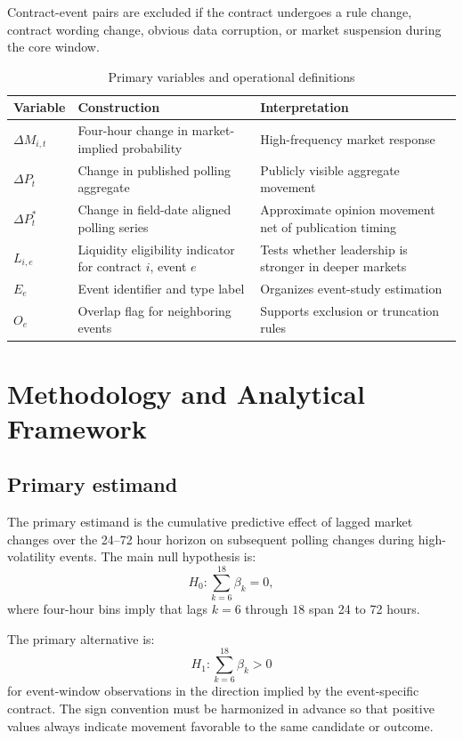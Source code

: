 \documentclass[11pt]{article}
\begin{document}
Contract-event pairs are excluded if the contract undergoes a rule change, contract wording change, obvious data corruption, or market suspension during the core window.

\begin{table}[t]
\centering
\caption{Primary variables and operational definitions}
\begin{tabular}{p{3.1cm}p{4.2cm}p{5.3cm}}
\toprule
Variable & Construction & Interpretation \\
\midrule
$\Delta M_{i,t}$ & Four-hour change in market-implied probability & High-frequency market response \\
$\Delta P_t$ & Change in published polling aggregate & Publicly visible aggregate movement \\
$\Delta P_t^{\ast}$ & Change in field-date aligned polling series & Approximate opinion movement net of publication timing \\
$L_{i,e}$ & Liquidity eligibility indicator for contract $i$, event $e$ & Tests whether leadership is stronger in deeper markets \\
$E_e$ & Event identifier and type label & Organizes event-study estimation \\
$O_e$ & Overlap flag for neighboring events & Supports exclusion or truncation rules \\
\bottomrule
\end{tabular}
\end{table}

\section{Methodology and Analytical Framework}

\subsection{Primary estimand}
The primary estimand is the cumulative predictive effect of lagged market changes over the 24--72 hour horizon on subsequent polling changes during high-volatility events. The main null hypothesis is:
\[
H_0: \sum_{k=6}^{18} \beta_k = 0,
\]
where four-hour bins imply that lags $k=6$ through $18$ span 24 to 72 hours.

The primary alternative is:
\[
H_1: \sum_{k=6}^{18} \beta_k > 0
\]
for event-window observations in the direction implied by the event-specific contract. The sign convention must be harmonized in advance so that positive values always indicate movement favorable to the same candidate or outcome.
\end{document}
